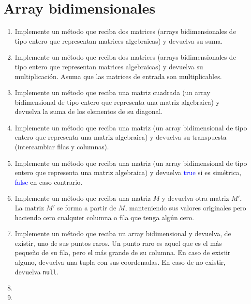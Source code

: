 \section{Array bidimensionales}
\begin{enumerate}
    \item
    Implemente un método que reciba dos matrices (arrays bidimensionales de tipo entero que representan matrices algebraicas) y devuelva su suma.

    \item
    Implemente un método que reciba dos matrices (arrays bidimensionales de tipo entero que representan matrices algebraicas) y devuelva su multiplicación. Asuma que las matrices de entrada son multiplicables.

    \item
    Implemente un método que reciba una matriz cuadrada (un array bidimensional de tipo entero que representa una matriz algebraica) y devuelva la suma de los elementos de su diagonal.

    \item
    Implemente un método que reciba una matriz (un array bidimensional de tipo entero que representa una matriz algebraica) y devuelva su transpuesta (intercambiar filas y columnas).

    \item 
    Implemente un método que reciba una matriz (un array bidimensional de tipo entero que representa una matriz algebraica) y devuelva \textcolor{blue}{true} si es simétrica, \textcolor{blue}{false} en caso contrario.

    \item
    Implemente un método que reciba una matriz \(M\) y devuelva otra matriz \(M'\). La matriz \(M'\) se forma a partir de \(M\), manteniendo sus valores originales pero haciendo cero cualquier columna o fila que tenga algún cero.

    \item
    Implemente un método que reciba un array bidimensional y devuelva, de existir, uno de sus puntos raros. Un punto raro es aquel que es el más pequeño de su fila, pero el más grande de su columna. En caso de existir alguno, devuelva una tupla con sus coordenadas. En caso de no existir, devuelva \texttt{null}.
    
    \item
    

    \item
    


\end{enumerate}
